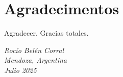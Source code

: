 \chapter*{Agradecimentos}

Agradecer. Gracias totales.







\begin{flushright}
    \textit{Rocío Belén Corral} \\
		\textit{Mendoza, Argentina} \\
    \textit{Julio 2025}
\end{flushright}

